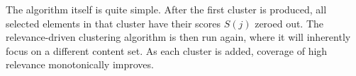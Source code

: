 The algorithm itself is quite simple.  After the first cluster is produced, all selected elements in that cluster have their scores $S(j)$ zeroed out.  The relevance-driven clustering algorithm is then run again, where it will inherently focus on a different content set.  As each cluster is added, coverage of high relevance monotonically improves.










